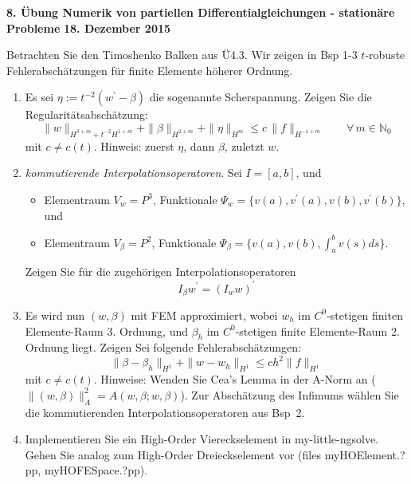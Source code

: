 \documentclass[11pt,a4paper]{report}
\begin{document}
\begin{center}
\textbf{8. \"Ubung Numerik von partiellen Differentialgleichungen - station\"are Probleme} \newline 
\textbf{18. Dezember 2015}
\end{center}
Betrachten Sie den Timoshenko Balken aus \"U4.3. Wir zeigen in Bsp 1-3
$t$-robuste Fehlerabsch\"atzungen f\"ur finite Elemente h\"oherer Ordnung.

\begin{enumerate}

\item Es sei $\eta := t^{-2} (w^\prime - \beta)$ die sogenannte
  Scherspannung. Zeigen Sie die Regularit\"atsabsch\"atzung:
$$
\| w \|_{H^{3+m} + t^{-2} H^{1+m}} + \| \beta \|_{H^{2+m}} + \| \eta \|_{H^m}
\le c \, \| f \|_{H^{-1+m}} \qquad \forall \, m \in  \mathbb{N}_0
$$
mit $c \neq c(t)$. Hinweis: zuerst $\eta$, dann $\beta$, zuletzt $w$.

\item {\em kommutierende Interpolationsoperatoren}. Sei $I = [a,b]$,
  und
\begin{itemize}
\item
Elementraum $V_w = P^3$, Funktionale $\Psi_w = \{ v(a),
v^\prime(a), v(b), v^\prime(b) \}$, und
\item
Elementraum $V_\beta = P^2$, Funktionale $\Psi_\beta = \{ v(a), v(b),
\int_a^b v(s) ds \}$.
\end{itemize}
Zeigen Sie f\"ur die zugeh\"origen Interpolationsoperatoren 
$$
I_\beta w^\prime = (I_w w)^\prime
$$

\item Es wird nun $(w,\beta)$ mit FEM approximiert, wobei $w_h$ im $C^0$-stetigen finiten Elemente-Raum
  3. Ordnung, und $\beta_h$ im $C^0$-stetigen finite Elemente-Raum
  2. Ordnung liegt. Zeigen Sei folgende Fehlerabsch\"atzungen:
$$
\| \beta - \beta_h \|_{H^1} + \| w - w_h \|_{H^1}\leq c h^2 \| f \|_{H^1}
$$
mit $c \neq c(t)$.
Hinweise: Wenden Sie Cea's Lemma in der A-Norm an ($\|(w,\beta)\|_A^2 =
A(w,\beta; w, \beta)$). Zur Absch\"atzung
des Infimums w\"ahlen Sie die kommutierenden Interpolationsoperatoren
aus Bsp~2. 

\item Implementieren Sie ein High-Order Viereckselement in
  my-little-ngsolve. Gehen Sie analog zum High-Order Dreieckselement
  vor (files myHOElement.?pp, myHOFESpace.?pp).



\end{enumerate}
\end{document}
